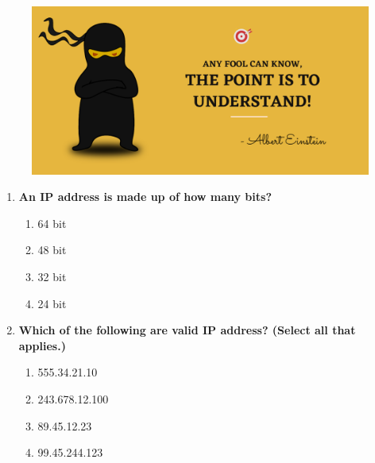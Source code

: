 \setlength{\columnsep}{3pt}
\begin{flushleft}
	
	\paragraph{}
	\bigskip
	
	\begin{figure}[h!]
		\centering
		\includegraphics[scale=.2]{content/practise.jpg}
	\end{figure}	
	\begin{enumerate}
		
		\item \textbf{An IP address is made up of how many bits?}
		\begin{enumerate}[label=(\alph*)]
			\item 64 bit
			\item 48 bit
			\item 32 bit  %
			\item 24 bit
		\end{enumerate}
		\bigskip
		\bigskip
		
		\item \textbf{Which of the following are valid IP address? (Select all that applies.)}
		\begin{enumerate}[label=(\alph*)]
				\item 555.34.21.10
			\item 243.678.12.100
			\item 89.45.12.23    %
			\item 99.45.244.123  %
		\end{enumerate}
		\bigskip
		\bigskip	
		

\end{enumerate}
\end{flushleft}
